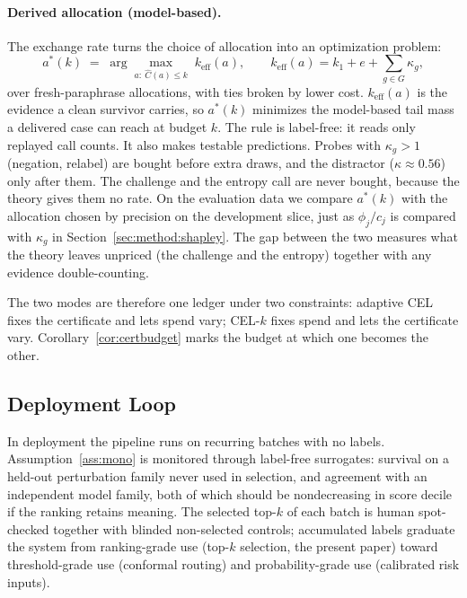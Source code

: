 \documentclass[11pt]{article}
\newcommand{\keff}{k_{\mathrm{eff}}}
\begin{document}
\paragraph{Derived allocation (model-based).} The exchange rate turns
the choice of allocation into an optimization problem:
\begin{equation}
  a^{\ast}(k) \;=\; \arg\max_{a:\ \hat C(a) \le k}\;
  \keff(a), \qquad
  \keff(a) = k_1 + e + \sum_{g \in G} \kappa_g ,
  \label{eq:derivedalloc}
\end{equation}
over fresh-paraphrase allocations, with ties broken by lower cost.
$\keff(a)$ is the evidence a clean survivor carries, so $a^{\ast}(k)$
minimizes the model-based tail mass a delivered case can reach at
budget $k$. The rule is label-free: it reads only replayed call
counts. It also makes testable predictions. Probes with $\kappa_g > 1$
(negation, relabel) are bought before extra draws, and the distractor
($\kappa \approx 0.56$) only after them. The challenge and the entropy
call are never bought, because the theory gives them no rate. On the
evaluation data we compare $a^{\ast}(k)$ with the allocation chosen by
precision on the development slice, just as $\phi_j / c_j$ is compared
with $\kappa_g$ in Section~\ref{sec:method:shapley}. The gap between
the two measures what the theory leaves unpriced (the challenge and the
entropy) together with any evidence double-counting.

The two modes are therefore one ledger under two constraints:
adaptive CEL fixes the certificate and lets spend vary; CEL-$k$ fixes
spend and lets the certificate vary. Corollary~\ref{cor:certbudget}
marks the budget at which one becomes the other.

\subsection{Deployment Loop}
\label{sec:method:loop}

In deployment the pipeline runs on recurring batches with no labels.
Assumption~\ref{ass:mono} is monitored through label-free surrogates:
survival on a held-out perturbation family never used in selection,
and agreement with an independent model family, both of which should be
nondecreasing in score decile if the ranking retains meaning. The
selected top-$k$ of each batch is human spot-checked together with
blinded non-selected controls; accumulated labels graduate the system
from ranking-grade use (top-$k$ selection, the present paper) toward
threshold-grade use (conformal routing) and probability-grade use
(calibrated risk inputs).
\end{document}
